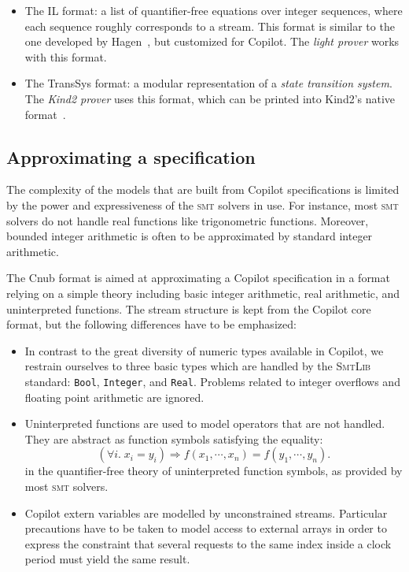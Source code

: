 \begin{itemize}
\item
  The {IL} format: a list
  of quantifier-free equations over integer sequences, where each sequence
  roughly corresponds to a stream.   This
format is similar to the one developed by Hagen~\cite{HagenPhD}, but customized for Copilot.   The \emph{light prover} works with this
  format.
\item The {TransSys} format: a modular representation of a
  \emph{state transition system}. The \emph{Kind2 prover} uses this
  format, which can be printed into Kind2's native format~\cite{kind}.
\end{itemize}

\subsection{Approximating a specification}

The complexity of the models that are built from Copilot specifications is
limited by the power and expressiveness of the \textsc{smt} solvers in use. For instance,
most \textsc{smt} solvers do not handle real functions like trigonometric functions. Moreover, bounded integer arithmetic is often to be approximated by standard integer arithmetic.

The {Cnub} format is aimed at approximating a Copilot specification in a format relying on a simple theory including basic integer arithmetic, real arithmetic, and uninterpreted functions. The stream structure is kept from the Copilot core format, but the following differences have to be emphasized:

\begin{itemize}
\item In contrast to the great diversity of numeric types available in Copilot, we restrain ourselves to three basic types which are handled by the \textsc{SmtLib} standard: \texttt{Bool}, \texttt{Integer}, and \texttt{Real}. Problems related to integer overflows and floating point arithmetic are ignored.



\item {Uninterpreted functions} are used to model operators that are not
  handled. They are abstract as function symbols satisfying the
  equality: $$ \left( \forall i . \; x_i = y_i \right) \Longrightarrow f(x_1,
  \cdots, x_n) = f(y_1, \cdots, y_n). $$ in the quantifier-free theory of
  uninterpreted function symbols, as provided by most \textsc{smt} solvers.

\item Copilot extern variables are modelled by unconstrained streams. Particular precautions have to be taken to model access to external arrays in order to express the constraint that several requests to the same index inside a clock period must yield the same result.

\end{itemize}

